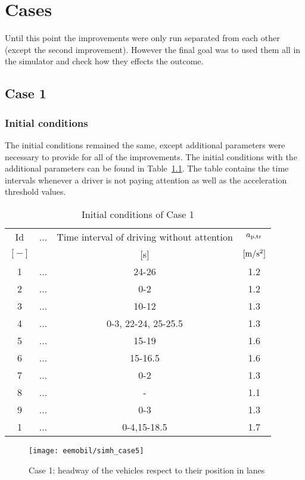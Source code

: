\chapter{Cases}
		Until this point the improvements were only run separated from each other (except the second improvement). However the final goal was to used them all in the simulator and check how they effects the outcome.
		\section{Case 1}
			\subsection*{Initial conditions}
			The initial conditions remained the same, except additional parameters were necessary to provide for all of the improvements. The initial conditions with the additional parameters can be found in Table~\ref{tab:new_array}. The table contains the time intervals whenever a driver is not paying attention as well as the acceleration threshold values.
			\begin{table}[ht]
				\begin{center}
					\begin{tabular}{ |c|c|c|c| }
						\hline
						Id & ... & Time interval of driving without attention & $a_{\rm p,tr}$\\
						$[-]$ & & [s]& $\rm [m/s^2]$\\
						\hline
						1 & ... & 24-26 & 1.2 \\
						2 & ... & 0-2 & 1.2 \\
						3 & ... & 10-12 & 1.3 \\
						4 & ... & 0-3, 22-24, 25-25.5 & 1.3 \\
						5 & ... & 15-19 & 1.6 \\
						6 & ... & 15-16.5 & 1.6 \\
						7 & ... & 0-2 & 1.3 \\
						8 & ... & - & 1.1 \\
						9 & ... & 0-3 & 1.3 \\
						1 & ... & 0-4,15-18.5 & 1.7 \\
						\hline
					\end{tabular}
				\end{center}
				\caption{Initial conditions of Case 1}
				\label{tab:new_array}
			\end{table}
			\begin{figure}
				\centering
				\texttt{[image: eemobil/simh\_case5]}
				\caption{Case 1: headway of the vehicles respect to their position in lanes}
				\label{fig:red_light_situationh2}
			\end{figure}
